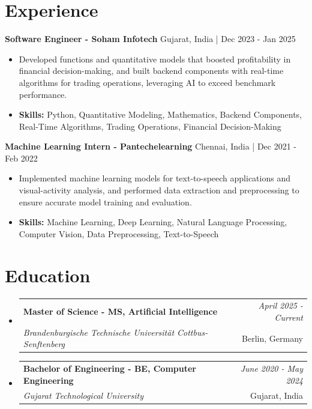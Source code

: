 \documentclass[a4paper,11pt]{article}
\makeatletter
\newcommand{\resumeSubheading}[4]{
\vspace{0.5mm}\item
    \begin{tabular*}{0.98\textwidth}[t]{l@{\extracolsep{\fill}}r}
        \textbf{#1} & \textit{\footnotesize{#4}} \\
        \textit{\footnotesize{#3}} &  \footnotesize{#2}\\
    \end{tabular*}
    \vspace{-2.4mm}
}
\makeatother
\begin{document}
\section{\textbf{Experience}}


\vspace{1mm}
  \textbf{Software Engineer - Soham Infotech} \hfill Gujarat, India | Dec 2023 - Jan 2025
\vspace{-1.5mm} %
\begin{itemize}
  \item Developed functions and quantitative models that boosted profitability in financial decision-making, and built backend components with real-time algorithms for trading operations, leveraging AI to exceed benchmark performance.

\vspace{-2mm}
  \item \textbf{Skills:} Python, Quantitative Modeling, Mathematics, Backend Components, Real-Time Algorithms, Trading Operations, Financial Decision-Making
\end{itemize}

\vspace{1mm}
  \textbf{Machine Learning Intern - Pantechelearning} \hfill Chennai, India | Dec 2021 - Feb 2022
\vspace{-1.5mm} %
\begin{itemize}
  \item Implemented machine learning models for text-to-speech applications and visual-activity analysis, and performed data extraction and preprocessing to ensure accurate model training and evaluation.
\vspace{-2mm}
  \item \textbf{Skills:} Machine Learning, Deep Learning, Natural Language Processing, Computer Vision, Data Preprocessing, Text-to-Speech
\end{itemize}\section{\textbf{Education}}
\vspace{-0.4mm}

\begin{itemize}
\resumeSubheading
{Master of Science - MS, Artificial Intelligence }{Berlin, Germany}
{Brandenburgische Technische Universität Cottbus-Senftenberg  }{April 2025 - Current}

\vspace{1.0mm} %
\resumeSubheading
{Bachelor of Engineering - BE, Computer Engineering  }{Gujarat, India}
{Gujarat Technological University }{June 2020 - May 2024}

\end{itemize}
\end{document}
